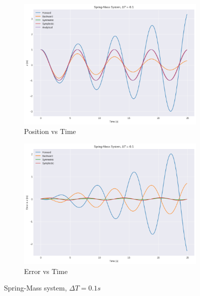 \documentclass[11pt]{article}
\begin{document}
\begin{figure}[H]
    \centering
    \begin{subfigure}[H]{0.49\linewidth}
      \includegraphics[width=\linewidth]{../sm1.png}
      \caption*{Position vs Time}
    \end{subfigure}
    \begin{subfigure}[H]{0.49\linewidth}
      \includegraphics[width=\linewidth]{../sm2.png}
      \caption*{Error vs Time}
    \end{subfigure}
    \caption*{Spring-Mass system, $\Delta T = 0.1s$}
  \end{figure}
\end{document}
